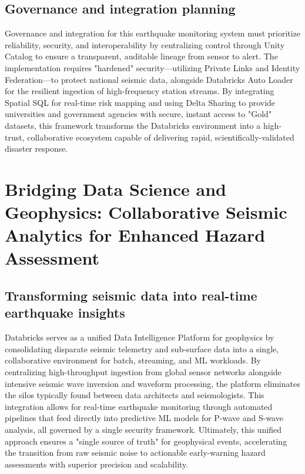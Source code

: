 \documentclass[data,article,submit,pdftex,moreauthors]{Definitions/mdpi}
\begin{document}
\subsection{Governance and integration planning}

Governance and integration for this earthquake monitoring system must prioritize reliability, security, and interoperability by centralizing control through Unity Catalog to ensure a transparent, auditable lineage from sensor to alert. The implementation requires "hardened" security—utilizing Private Links and Identity Federation—to protect national seismic data, alongside Databricks Auto Loader for the resilient ingestion of high-frequency station streams. By integrating Spatial SQL for real-time risk mapping and using Delta Sharing to provide universities and government agencies with secure, instant access to "Gold" datasets, this framework transforms the Databricks environment into a high-trust, collaborative ecosystem capable of delivering rapid, scientifically-validated disaster response.

\section{Bridging Data Science and Geophysics: Collaborative Seismic Analytics for Enhanced Hazard Assessment}

\subsection{Transforming seismic data into real-time earthquake insights}

Databricks serves as a unified Data Intelligence Platform for geophysics by consolidating disparate seismic telemetry and sub-surface data into a single, collaborative environment for batch, streaming, and ML workloads. By centralizing high-throughput ingestion from global sensor networks alongside intensive seismic wave inversion and waveform processing, the platform eliminates the silos typically found between data architects and seismologists. This integration allows for real-time earthquake monitoring through automated pipelines that feed directly into predictive ML models for P-wave and S-wave analysis, all governed by a single security framework. Ultimately, this unified approach ensures a "single source of truth" for geophysical events, accelerating the transition from raw seismic noise to actionable early-warning hazard assessments with superior precision and scalability.
\end{document}
